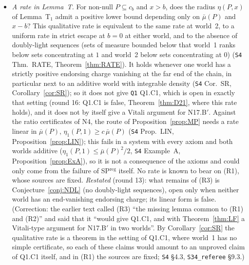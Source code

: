 \documentclass[11pt]{article}
\theoremstyle{definition}
\theoremstyle{remark}
\newcommand{\src}[1]{\texttt{#1}}
\begin{document}
\begin{itemize}[leftmargin=*]
\item[\textbf{(R3)}] \emph{A rate in Lemma~T.} For non-null $P\subseteq c_b$ and $x>b$, does the radius $\eta(P,x)$ of Lemma~T$_1$ admit a positive lower bound depending only on $\bar\mu(P)$ and $x-b$? This qualitative rate is equivalent to the same rate at world~2, to a uniform rate in strict escape at $b=0$ at either world, and to the absence of doubly-light sequences (sets of measure bounded below that world~1 ranks below sets concentrating at $1$ and world~2 below sets concentrating at $0$) (\src{S4} Thm.~RATE, Theorem~\ref{thm:RATE}). It holds whenever one world has a strictly positive endorsing charge vanishing at the far end of the chain, in particular next to an additive world with integrable density (\src{S4} Cor.~SR, Corollary~\ref{cor:SR}); so it does not give \src{Q1} Q1.C1, which is open in exactly that setting (round 16: Q1.C1 is false, Theorem~\ref{thm:D21}, where this rate holds), and it does not by itself give a Vitali argument for N17.B$'$. Against the ratio certificates of N4, the route of Proposition~\ref{prop:MP} needs a rate linear in $\bar\mu(P)$, $\eta_1(P,1)\ge c\,\bar\mu(P)$ (\src{S4} Prop.~LIN, Proposition~\ref{prop:LIN}); this fails in a system with every axiom and both worlds additive ($\eta_1(P,1)\le\bar\mu(P)^2/2$, \src{S4} Example~A, Proposition~\ref{prop:ExA}), so it is not a consequence of the axioms and could only come from the failure of SP$^{\mathrm{reg}}$ itself. No rate is known to bear on (R1), whose sources are fixed. \emph{Restated} (round 13): what remains of (R3) is Conjecture~\ref{conj:NDL} (no doubly-light sequences), open only when neither world has an end-vanishing endorsing charge; its linear form is false. (Correction: the earlier text called (R3) ``the missing lemma common to (R1) and (R2)'' and said that it ``would give Q1.C1, and with Theorem~\ref{thm:LF} a Vitali-type argument for N17.B$'$ in two worlds''. By Corollary~\ref{cor:SR} the qualitative rate is a theorem in the setting of Q1.C1, where world~1 has no simple certificate, so each of these claims would amount to an unproved claim of Q1.C1 itself, and in (R1) the sources are fixed; \src{S4} \S4.3, \src{S34\_referee} \S9.3.)

\end{itemize}
\end{document}
